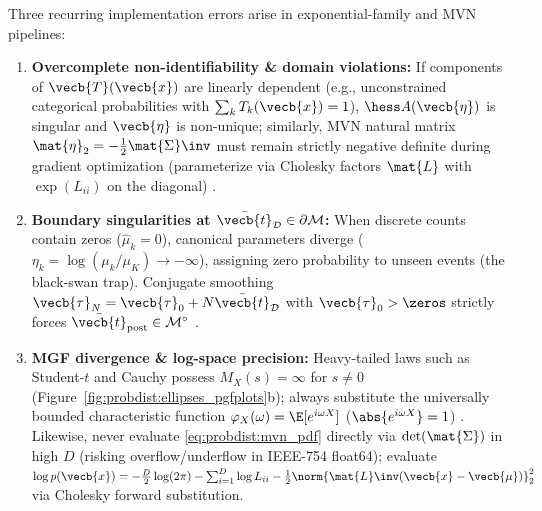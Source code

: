 \documentclass[../../../../master.tex]{subfiles}
\begin{document}
\begin{pitfall}
Three recurring implementation errors arise in exponential-family and MVN pipelines:
\begin{enumerate}
  \item \textbf{Overcomplete non-identifiability \& domain violations:} If components of $\vecb{T}(\vecb{x})$ are linearly dependent (e.g., unconstrained categorical probabilities with $\sum_k T_k(\vecb{x})=1$), $\hess A(\vecb{\eta})$ is singular and $\vecb{\eta}$ is non-unique; similarly, MVN natural matrix $\mat{\eta}_2 = -\tfrac{1}{2}\mat{\Sigma}\inv$ must remain strictly negative definite during gradient optimization (parameterize via Cholesky factors $\mat{L}$ with $\exp(L_{ii})$ on the diagonal) .
  \item \textbf{Boundary singularities at $\bar{\vecb{t}}_{\mathcal{D}} \in \partial\mathcal{M}$:} When discrete counts contain zeros ($\hat{\mu}_k = 0$), canonical parameters diverge ($\eta_k = \log(\mu_k/\mu_K) \to -\infty$), assigning zero probability to unseen events (the black-swan trap). Conjugate smoothing $\vecb{\tau}_N = \vecb{\tau}_0 + N\bar{\vecb{t}}_{\mathcal{D}}$ with $\vecb{\tau}_0 > \zeros$ strictly forces $\bar{\vecb{t}}_{\mathrm{post}} \in \mathcal{M}^\circ$ .
  \item \textbf{MGF divergence \& log-space precision:} Heavy-tailed laws such as Student-$t$ and Cauchy possess $M_X(s) = \infty$ for $s \neq 0$ (Figure~\ref{fig:probdist:ellipses_pgfplots}b); always substitute the universally bounded characteristic function $\varphi_X(\omega) = \E[e^{i\omega X}]$ ($\abs{e^{i\omega X}} = 1$) . Likewise, never evaluate \eqref{eq:probdist:mvn_pdf} directly via $\det(\mat{\Sigma})$ in high $D$ (risking overflow/underflow in IEEE-754 float64); evaluate $\log p(\vecb{x}) = -\frac{D}{2}\log(2\pi) - \sum_{i=1}^D \log L_{ii} - \frac{1}{2}\norm{\mat{L}\inv(\vecb{x}-\vecb{\mu})}_2^2$ via Cholesky forward substitution.
\end{enumerate}
\end{pitfall}
\end{document}
